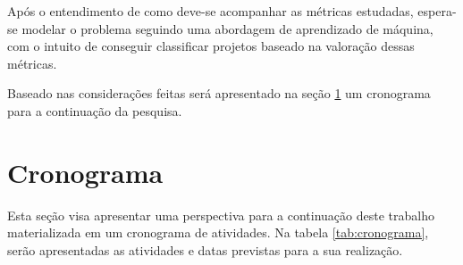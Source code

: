 Após o entendimento de como deve-se acompanhar as métricas estudadas, espera-se 
modelar o problema seguindo uma abordagem de aprendizado de
máquina, com o intuito de conseguir classificar projetos baseado na valoração
dessas métricas.

Baseado nas considerações feitas será apresentado na seção
\ref{sec:cronograma} um cronograma para a continuação da pesquisa.

\section{Cronograma} \label{sec:cronograma}

Esta seção visa apresentar uma perspectiva para a continuação deste trabalho
materializada em um cronograma de atividades. Na tabela \ref{tab:cronograma},
serão apresentadas as atividades e datas previstas para a sua realização.

\begin{table}[h]
\caption{Cronograma}
\label{tab:cronograma}
\end{table}

